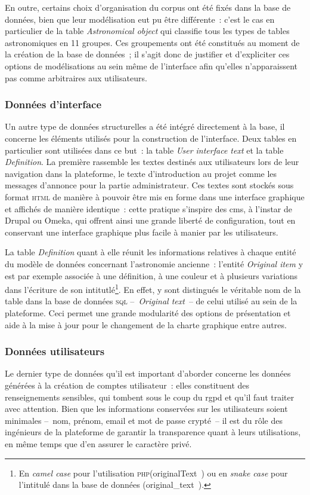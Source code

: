 \documentclass[a4paper,12pt,twoside]{book}
\newcommand{\eng}{\emph}
\newcommand{\Oi}{\eng{Original item}\xspace}
\newcommand{\html}{\textsc{html}\xspace}
\newcommand{\php}{\textsc{php}\xspace}
\newcommand{\g}[1]{\og#1~\fg}
\newcommand{\rgpd}{\gls{rgpd}\xspace}
\newcommand{\cms}{\gls{cms}\xspace}
\begin{document}
En outre, certains choix d'organisation du corpus ont été fixés dans la base de données, bien que leur modélisation eut pu être différente~: c'est le cas en particulier de la table \eng{Astronomical object} qui classifie tous les types de tables astronomiques en 11 groupes. Ces groupements ont été constitués au moment de la création de la base de données~; il s'agit donc de justifier et d'expliciter ces options de modélisations au sein même de l'interface afin qu'elles n'apparaissent pas comme arbitraires aux utilisateurs.

			\subsubsection{Données d'interface}
Un autre type de données structurelles a été intégré directement à la base, il concerne les éléments utilisés pour la construction de l'interface. Deux tables en particulier sont utilisées dans ce but~: la table \eng{User interface text} et la table \eng{Definition}. La première rassemble les textes destinés aux utilisateurs lors de leur navigation dans la plateforme, le texte d'introduction au projet comme les messages d'annonce pour la partie administrateur. Ces textes sont stockés sous format \html de manière à pouvoir être mis en forme dans une interface graphique et affichés de manière identique~: cette pratique s'inspire des \cms, à l'instar de Drupal ou Omeka, qui offrent ainsi une grande liberté de configuration, tout en conservant une interface graphique plus facile à manier par les utilisateurs.

La table \eng{Definition} quant à elle réunit les informations relatives à chaque entité du modèle de données concernant l'astronomie ancienne~: l'entité \Oi y est par exemple associée à une définition, à une couleur et à plusieurs variations dans l'écriture de son intitutlé\footnote{En \eng{camel case} pour l'utilisation \php (\g{originalText}) ou en \eng{snake case} pour l'intitulé dans la base de données (\g{original\_text}).}. En effet, y sont distingués le véritable nom de la table dans la base de données \textsc{sql} –~\eng{Original text}~– de celui utilisé au sein de la plateforme. Ceci permet une grande modularité des options de présentation et aide à la mise à jour pour le changement de la charte graphique entre autres.

			\subsubsection{Données utilisateurs}
Le dernier type de données qu'il est important d'aborder concerne les données générées à la création de comptes utilisateur~: elles constituent des renseignements sensibles, qui tombent sous le coup du \rgpd et qu'il faut traiter avec attention. Bien que les informations conservées sur les utilisateurs soient minimales –~nom, prénom, email et mot de passe crypté~– il est du rôle des ingénieurs de la plateforme de garantir la transparence quant à leurs utilisations, en même temps que d'en assurer le caractère privé.
\end{document}
